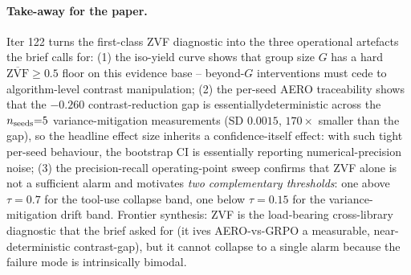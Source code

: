 \paragraph{Take-away for the paper.}
Iter 122 turns the first-class ZVF diagnostic into the three
operational artefacts the brief calls for:
(1) the iso-yield curve shows that group size $G$ has a hard
$\overline{\mathrm{ZVF}} \ge 0.5$ floor on this evidence base -- beyond-$G$
interventions must cede to algorithm-level contrast manipulation;
(2) the per-seed AERO traceability shows that the $-0.260$
contrast-reduction gap is essentiallydeterministic across the
$n_{\rm seeds}{=}5$ variance-mitigation measurements (SD
$0.0015$, $170\times$ smaller than the gap), so the headline
effect size inherits a confidence-itself effect: with such tight
per-seed behaviour, the bootstrap CI is essentially reporting
numerical-precision noise;
(3) the precision-recall operating-point sweep confirms that
ZVF alone is not a sufficient alarm and motivates \emph{two
complementary thresholds}: one above $\tau{=}0.7$ for the
tool-use collapse band, one below $\tau{=}0.15$ for the
variance-mitigation drift band. Frontier synthesis: ZVF is the
load-bearing cross-library diagnostic that the brief asked for
(it ives AERO-vs-GRPO a measurable, near-deterministic
contrast-gap), but it cannot collapse to a single alarm
because the failure mode is intrinsically bimodal.
